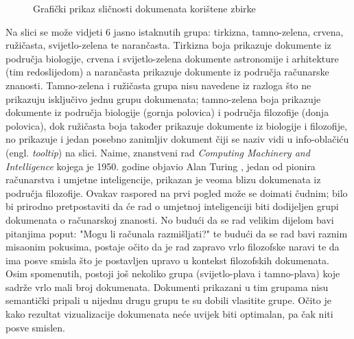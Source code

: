 \documentclass[times, utf8, zavrsni, numeric]{fer}
\begin{document}
\begin{figure}
\caption{Grafički prikaz sličnosti dokumenata korištene zbirke}
\label{img:turing}
\end{figure}

Na slici se može vidjeti 6 jasno istaknutih grupa: tirkizna, tamno-zelena, crvena, ružičasta, svijetlo-zelena te narančasta. Tirkizna boja prikazuje dokumente iz područja biologije, crvena i svijetlo-zelena dokumente astronomije i arhitekture (tim redoslijedom) a narančasta prikazuje dokumente iz područja računarske znanosti. Tamno-zelena i ružičasta grupa nisu navedene iz razloga što ne prikazuju isključivo jednu grupu dokumenata; tamno-zelena boja prikazuje dokumente iz područja biologije (gornja polovica) i područja filozofije (donja polovica), dok ružičasta boja također prikazuje dokumente iz biologije i filozofije, no prikazuje i jedan posebno zanimljiv dokument čiji se naziv vidi u info-oblačiću (engl. \textit{tooltip}) na slici. Naime, znanstveni rad \textit{Computing Machinery and Intelligence} kojega je 1950. godine objavio Alan Turing \cite{turing2009computing}, jedan od pionira računarstva i umjetne inteligencije, prikazan je veoma blizu dokumenata iz područja filozofije. Ovakav raspored na prvi pogled može se doimati čudnim; bilo bi prirodno pretpostaviti da će rad o umjetnoj inteligenciji biti dodijeljen grupi dokumenata o računarskoj znanosti. No budući da se rad velikim dijelom bavi pitanjima poput: "Mogu li računala razmišljati?" te budući da se rad bavi raznim misaonim pokusima, postaje očito da je rad zapravo vrlo filozofske naravi te da ima posve smisla što je postavljen upravo u kontekst filozofskih dokumenata. Osim spomenutih, postoji još nekoliko grupa (svijetlo-plava i tamno-plava) koje sadrže vrlo mali broj dokumenata. Dokumenti prikazani u tim grupama nisu semantički pripali u nijednu drugu grupu te su dobili vlasitite grupe. Očito je kako rezultat vizualizacije dokumenata neće uvijek biti optimalan, pa čak niti posve smislen.
\end{document}

